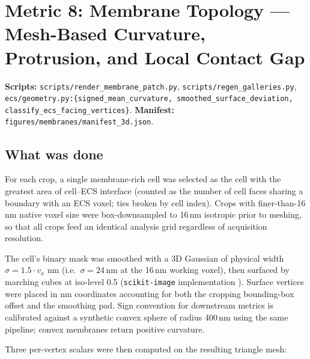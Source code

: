 %

\section*{Metric 8: Membrane Topology --- Mesh-Based Curvature, Protrusion, and Local Contact Gap}

{\small\textbf{Scripts:} \texttt{scripts/render\_membrane\_patch.py},
\texttt{scripts/regen\_galleries.py},
\texttt{ecs/geometry.py:\{signed\_mean\_curvature, smoothed\_surface\_deviation,
classify\_ecs\_facing\_vertices\}}.
\textbf{Manifest:} \texttt{figures/membranes/manifest\_3d.json}.}

\subsection*{What was done}
For each crop, a single membrane-rich cell was selected as the cell with
the greatest area of cell--ECS interface (counted as the number of cell
faces sharing a boundary with an ECS voxel; ties broken by cell index).
Crops with finer-than-16\,nm native voxel size were box-downsampled to
16\,nm isotropic prior to meshing, so that all crops feed an identical
analysis grid regardless of acquisition resolution.

The cell's binary mask was smoothed with a 3D Gaussian of physical width
$\sigma = 1.5 \cdot v_x$ nm (i.e.~$\sigma = 24$\,nm at the 16\,nm working
voxel), then surfaced by marching cubes \cite{Lorensen1987} at iso-level
0.5 (\texttt{scikit-image} implementation \cite{vanderWalt2014}). Surface vertices were placed in nm coordinates accounting
for both the cropping bounding-box offset and the smoothing pad. Sign
convention for downstream metrics is calibrated against a synthetic
convex sphere of radius 400\,nm using the same pipeline; convex membranes
return positive curvature.

Three per-vertex scalars were then computed on the resulting triangle mesh:

